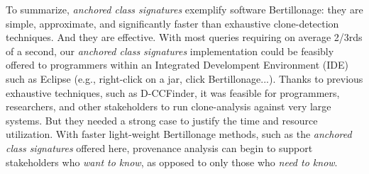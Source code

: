 


To summarize, \emph{anchored class signatures} exemplify software Bertillonage:
they are simple, approximate, and significantly faster than exhaustive clone-detection
techniques.   And they are effective.  With most queries requiring on average 2/3rds of a second,
our \emph{anchored class signatures} implementation could be feasibly offered to programmers
within an Integrated Develompent Environment (IDE) such as Eclipse (e.g., right-click on a jar,  click Bertillonage...).
Thanks to previous exhaustive techniques, such as D-CCFinder, it was feasible for programmers,
researchers, and other stakeholders to
run clone-analysis against very large systems.  But they needed a strong case to justify the
time and resource utilization.  With faster light-weight Bertillonage methods, such as
the \emph{anchored class signatures} offered here, provenance analysis
can begin to support stakeholders who \emph{want to know}, as opposed to only those who \emph{need to know}.







                                                                   
